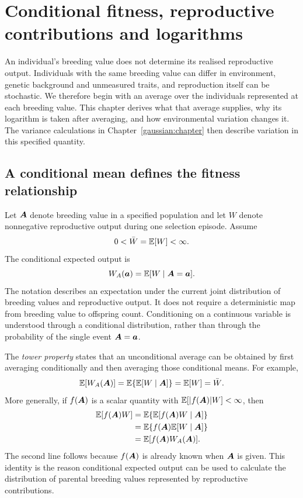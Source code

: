 \chapter{Conditional fitness, reproductive contributions and logarithms}
\label{conditioning:chapter}

An individual's breeding value does not determine its realised reproductive
output. Individuals with the same breeding value can differ in environment,
genetic background and unmeasured traits, and reproduction itself can be
stochastic. We therefore begin with an average over the individuals represented
at each breeding value. This chapter derives what that average supplies, why its
logarithm is taken after averaging, and how environmental variation changes it.
The variance calculations in Chapter~\ref{gaussian:chapter} then describe
variation in this specified quantity.

\section{A conditional mean defines the fitness relationship}

Let \(\boldsymbol{A}\) denote breeding value in a specified population and let \(W\)
denote nonnegative reproductive output during one selection episode. Assume
\[
 0<\bar W=\mathbb E[W]<\infty.
\]
The conditional expected output is
\begin{equation}
 W_A(\boldsymbol{a})=\mathbb E[W\mid\boldsymbol{A}=\boldsymbol{a}].
 \label{conditioning:target}
\end{equation}
The notation describes an expectation under the current joint distribution of
breeding values and reproductive output. It does not require a deterministic
map from breeding value to offspring count. Conditioning on a continuous
variable is understood through a conditional distribution, rather than through
the probability of the single event \(\boldsymbol{A}=\boldsymbol{a}\).

The \emph{tower property} states that an unconditional average can be obtained
by first averaging conditionally and then averaging those conditional means.
For example,
\[
 \mathbb E[W_A(\boldsymbol{A})]
 =\mathbb E\{\mathbb E[W\mid\boldsymbol{A}]\}
 =\mathbb E[W]=\bar W.
\]
More generally, if \(f(\boldsymbol{A})\) is a scalar quantity with
\(\mathbb E[|f(\boldsymbol{A})|W]<\infty\), then
\begin{align}
 \mathbb E[f(\boldsymbol{A})W]
 &=\mathbb E\{\mathbb E[f(\boldsymbol{A})W\mid\boldsymbol{A}]\}\nonumber\\
 &=\mathbb E\{f(\boldsymbol{A})\mathbb E[W\mid\boldsymbol{A}]\}\nonumber\\
 &=\mathbb E[f(\boldsymbol{A})W_A(\boldsymbol{A})].
 \label{conditioning:tower_weight}
\end{align}
The second line follows because \(f(\boldsymbol{A})\) is already known when
\(\boldsymbol{A}\) is given. This identity is the reason conditional expected output
can be used to calculate the distribution of parental breeding values
represented by reproductive contributions.

